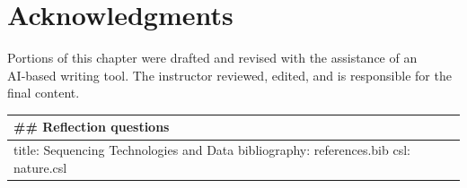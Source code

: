 \documentclass[
  letterpaper,
  DIV=11,
  numbers=noendperiod]{scrreprt}
\begin{document}
\section{Acknowledgments}\label{acknowledgments}

Portions of this chapter were drafted and revised with the assistance of
an AI‑based writing tool. The instructor reviewed, edited, and is
responsible for the final content.

\begin{longtable}[]{@{}
  >{\raggedright\arraybackslash}p{}@{}}
\toprule\noalign{}
\begin{minipage}[b]{\linewidth}\raggedright
\#\# Reflection questions
\end{minipage} \\
\midrule\noalign{}
\endhead
\bottomrule\noalign{}
\endlastfoot
title: Sequencing Technologies and Data bibliography: references.bib
csl: nature.csl \\
\end{longtable}
\end{document}
